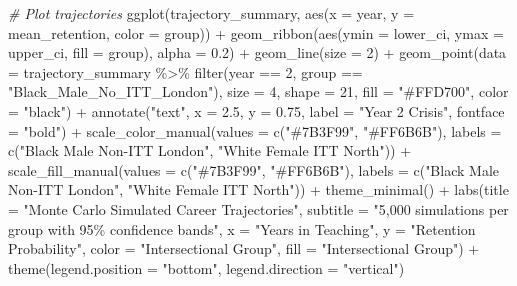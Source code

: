 \documentclass[
]{article}
\newenvironment{Shaded}{\begin{snugshade}}{\end{snugshade}}
\newcommand{\AttributeTok}[1]{\textcolor[rgb]{0.77,0.63,0.00}{#1}}
\newcommand{\CommentTok}[1]{\textcolor[rgb]{0.56,0.35,0.01}{\textit{#1}}}
\newcommand{\DecValTok}[1]{\textcolor[rgb]{0.00,0.00,0.81}{#1}}
\newcommand{\FloatTok}[1]{\textcolor[rgb]{0.00,0.00,0.81}{#1}}
\newcommand{\FunctionTok}[1]{\textcolor[rgb]{0.00,0.00,0.00}{#1}}
\newcommand{\NormalTok}[1]{#1}
\newcommand{\SpecialCharTok}[1]{\textcolor[rgb]{0.00,0.00,0.00}{#1}}
\newcommand{\StringTok}[1]{\textcolor[rgb]{0.31,0.60,0.02}{#1}}
\begin{document}
\begin{Shaded}
\begin{Highlighting}[]
\CommentTok{\# Plot trajectories}
\FunctionTok{ggplot}\NormalTok{(trajectory\_summary, }\FunctionTok{aes}\NormalTok{(}\AttributeTok{x =}\NormalTok{ year, }\AttributeTok{y =}\NormalTok{ mean\_retention, }\AttributeTok{color =}\NormalTok{ group)) }\SpecialCharTok{+}
  \FunctionTok{geom\_ribbon}\NormalTok{(}\FunctionTok{aes}\NormalTok{(}\AttributeTok{ymin =}\NormalTok{ lower\_ci, }\AttributeTok{ymax =}\NormalTok{ upper\_ci, }\AttributeTok{fill =}\NormalTok{ group), }\AttributeTok{alpha =} \FloatTok{0.2}\NormalTok{) }\SpecialCharTok{+}
  \FunctionTok{geom\_line}\NormalTok{(}\AttributeTok{size =} \DecValTok{2}\NormalTok{) }\SpecialCharTok{+}
  \FunctionTok{geom\_point}\NormalTok{(}\AttributeTok{data =}\NormalTok{ trajectory\_summary }\SpecialCharTok{\%\textgreater{}\%} \FunctionTok{filter}\NormalTok{(year }\SpecialCharTok{==} \DecValTok{2}\NormalTok{, group }\SpecialCharTok{==} \StringTok{"Black\_Male\_No\_ITT\_London"}\NormalTok{),}
             \AttributeTok{size =} \DecValTok{4}\NormalTok{, }\AttributeTok{shape =} \DecValTok{21}\NormalTok{, }\AttributeTok{fill =} \StringTok{"\#FFD700"}\NormalTok{, }\AttributeTok{color =} \StringTok{"black"}\NormalTok{) }\SpecialCharTok{+}
  \FunctionTok{annotate}\NormalTok{(}\StringTok{"text"}\NormalTok{, }\AttributeTok{x =} \FloatTok{2.5}\NormalTok{, }\AttributeTok{y =} \FloatTok{0.75}\NormalTok{, }\AttributeTok{label =} \StringTok{"Year 2 Crisis"}\NormalTok{, }\AttributeTok{fontface =} \StringTok{"bold"}\NormalTok{) }\SpecialCharTok{+}
  \FunctionTok{scale\_color\_manual}\NormalTok{(}\AttributeTok{values =} \FunctionTok{c}\NormalTok{(}\StringTok{"\#7B3F99"}\NormalTok{, }\StringTok{"\#FF6B6B"}\NormalTok{),}
                     \AttributeTok{labels =} \FunctionTok{c}\NormalTok{(}\StringTok{"Black Male Non{-}ITT London"}\NormalTok{, }\StringTok{"White Female ITT North"}\NormalTok{)) }\SpecialCharTok{+}
  \FunctionTok{scale\_fill\_manual}\NormalTok{(}\AttributeTok{values =} \FunctionTok{c}\NormalTok{(}\StringTok{"\#7B3F99"}\NormalTok{, }\StringTok{"\#FF6B6B"}\NormalTok{),}
                    \AttributeTok{labels =} \FunctionTok{c}\NormalTok{(}\StringTok{"Black Male Non{-}ITT London"}\NormalTok{, }\StringTok{"White Female ITT North"}\NormalTok{)) }\SpecialCharTok{+}
  \FunctionTok{theme\_minimal}\NormalTok{() }\SpecialCharTok{+}
  \FunctionTok{labs}\NormalTok{(}\AttributeTok{title =} \StringTok{"Monte Carlo Simulated Career Trajectories"}\NormalTok{,}
       \AttributeTok{subtitle =} \StringTok{"5,000 simulations per group with 95\% confidence bands"}\NormalTok{,}
       \AttributeTok{x =} \StringTok{"Years in Teaching"}\NormalTok{,}
       \AttributeTok{y =} \StringTok{"Retention Probability"}\NormalTok{,}
       \AttributeTok{color =} \StringTok{"Intersectional Group"}\NormalTok{,}
       \AttributeTok{fill =} \StringTok{"Intersectional Group"}\NormalTok{) }\SpecialCharTok{+}
  \FunctionTok{theme}\NormalTok{(}\AttributeTok{legend.position =} \StringTok{"bottom"}\NormalTok{,}
        \AttributeTok{legend.direction =} \StringTok{"vertical"}\NormalTok{)}
\end{Highlighting}
\end{Shaded}
\end{document}
